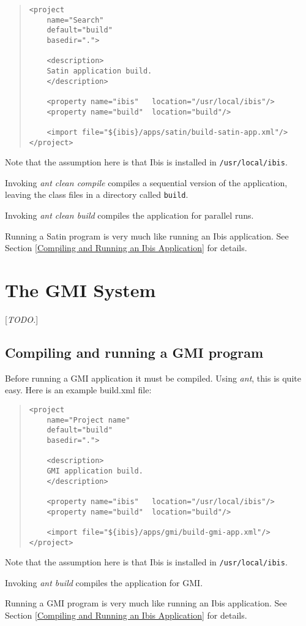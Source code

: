 \documentclass[10pt]{article}
\newcommand{\mysection}[1]{\section{#1}\label{#1}}
\newcommand{\mysubsection}[1]{\subsection{#1}\label{#1}}
\newcommand{\remark}[1]{[\emph{#1}]}
\begin{document}
\begin{quote}
\begin{verbatim}
<project
    name="Search"
    default="build"
    basedir=".">

    <description>
    Satin application build.
    </description>

    <property name="ibis"   location="/usr/local/ibis"/>
    <property name="build"  location="build"/>

    <import file="${ibis}/apps/satin/build-satin-app.xml"/>
</project>
\end{verbatim}
\end{quote}
Note that the assumption here is that Ibis is installed in
\texttt{/usr/local/ibis}.

Invoking \emph{ant clean compile} compiles a sequential version
of the application, 
leaving the class files in a directory called \texttt{build}.

Invoking \emph{ant clean build} compiles the application for parallel
runs.

Running a Satin program is very much like running an Ibis application.
See Section \ref{Compiling and Running an Ibis Application} for details.

\mysection{The GMI System}

\remark{TODO.}

\mysubsection{Compiling and running a GMI program}

Before running a GMI application it must be compiled.
Using \emph{ant}, this is quite easy. Here is an example build.xml file:

\begin{quote}
\begin{verbatim}
<project
    name="Project name"
    default="build"
    basedir=".">

    <description>
    GMI application build.
    </description>

    <property name="ibis"   location="/usr/local/ibis"/>
    <property name="build"  location="build"/>

    <import file="${ibis}/apps/gmi/build-gmi-app.xml"/>
</project>
\end{verbatim}
\end{quote}
Note that the assumption here is that Ibis is installed in
\texttt{/usr/local/ibis}.

Invoking \emph{ant build} compiles the application for GMI.

Running a GMI program is very much like running an Ibis application.
See Section \ref{Compiling and Running an Ibis Application} for details.
\end{document}
